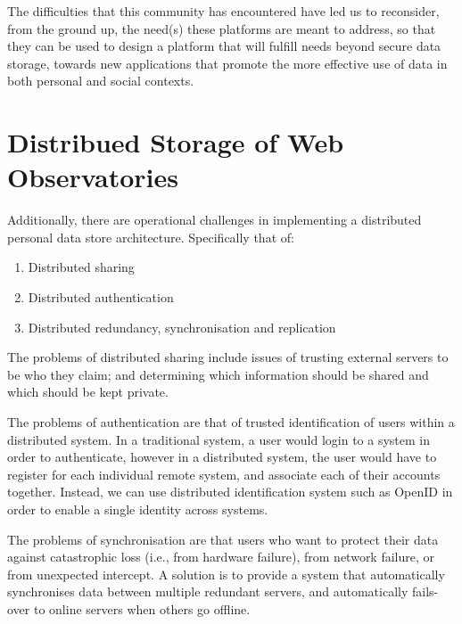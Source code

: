 \documentclass{acm_proc_article-sp}
\begin{document}
The difficulties that this community has encountered have led us to reconsider, from the ground up, the need(s) these platforms are meant to address, so that they can be used to design a platform that will fulfill needs beyond secure data storage, towards new applications that promote the more effective use of data in both personal and social contexts.

\section{Distribued Storage of Web Observatories}

Additionally, there are operational challenges in implementing a distributed
personal data store architecture. Specifically that of:

\begin{enumerate}
\item Distributed sharing
\item Distributed authentication
\item Distributed redundancy, synchronisation and replication
\end{enumerate}

The problems of distributed sharing include issues of trusting external servers to be who they claim; and determining which information should be shared and which should be kept private.

The problems of authentication are that of trusted identification of users within a distributed system. In a traditional system, a user would login to a system in order to authenticate, however in a distributed system, the user would have to register for each individual remote system, and associate each of their accounts together. Instead, we can use distributed identification system such as OpenID in order to enable a single identity across systems.

The problems of synchronisation are that users who want to protect their data against catastrophic loss (i.e., from hardware failure), from network failure,
or from unexpected intercept. A solution is to provide a system that automatically synchronises data between multiple redundant servers, and automatically fails-over to online servers when others go offline.




\balancecolumns
\end{document}
